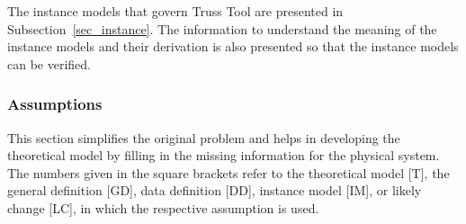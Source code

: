 \documentclass[12pt]{article}
\begin{document}




The instance models that govern Truss Tool are presented in
Subsection~\ref{sec_instance}.  The information to understand the meaning of the instance models and their derivation is also presented so that the instance models can be verified.

\subsubsection{Assumptions} \label{sec_assumpt}


This section simplifies the original problem and helps in developing the
theoretical model by filling in the missing information for the physical
system. The numbers given in the square brackets refer to the theoretical model
[T], the general definition [GD], data definition [DD], instance model [IM], or
likely change [LC], in which the respective assumption is used.
\end{document}
